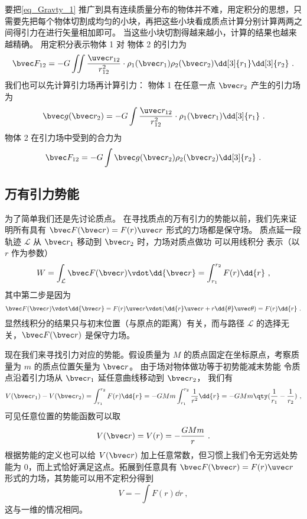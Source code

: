 要把\autoref{eq_Gravty_1} 推广到具有连续质量分布的物体并不难，用定积分的思想，只需要先把每个物体切割成均匀的小块，再把这些小块看成质点计算分别计算两两之间得引力在进行矢量相加即可。 当这些小块切割得越来越小，计算的结果也越来越精确。 用定积分表示物体 1 对 物体 2 的引力为
\begin{equation}
\bvec F_{12} = -G\iint \frac{\uvec r_{12}}{r_{12}^2}  \cdot \rho_1(\bvec r_1) \rho_2(\bvec r_2) \dd[3]{r_1} \dd[3]{r_2}~.
\end{equation}
我们也可以先计算引力场再计算引力： 物体 1 在任意一点 $\bvec r_2$ 产生的引力场为
\begin{equation}\label{eq_Gravty_4}
\bvec g(\bvec r_2) = -G\int \frac{\uvec r_{12}}{r_{12}^2}  \cdot \rho_1(\bvec r_1) \dd[3]{r_1}~.
\end{equation}
物体 2 在引力场中受到的合力为
\begin{equation}
\bvec F_{12} = -G\int \bvec g(\bvec r_2)\rho_2(\bvec r_2) \dd[3]{r_2}~.
\end{equation}

\subsection{万有引力势能}

为了简单我们还是先讨论质点。 在寻找质点的万有引力的势能以前，我们先来证明所有具有 $\bvec F(\bvec r) = F(r) \uvec r$ 形式的力场都是保守场。 质点延一段轨迹 $\mathcal{L}$ 从 $\bvec r_1$ 移动到 $\bvec r_2$ 时，力场对质点做功 可以用线积分 表示（以 $r$ 作为参数）
\begin{equation}\label{eq_Gravty_3}
W = \int_\mathcal{L} \bvec F(\bvec r) \vdot \dd{\bvec r} = \int_{r_1}^{r_2} F(r) \dd{r}~,
\end{equation}
其中第二步是因为
\begin{equation}
\bvec F(\bvec r) \vdot \dd{\bvec r} = F(r)\uvec  r \vdot (\dd{r} \uvec  r + r\dd{\theta} \uvec \theta ) = F(r) \dd{r}~.
\end{equation}
显然线积分的结果只与初末位置（与原点的距离）有关，而与路径 $\mathcal{L}$ 的选择无关，$\bvec F(\bvec r)$ 是保守力场。

现在我们来寻找引力对应的势能。假设质量为 $M$ 的质点固定在坐标原点，考察质量为 $m$ 的质点位置矢量为 $\bvec r$。 由于场对物体做功等于初势能减末势能
令质点沿着引力场从 ${\bvec r_1}$ 延任意曲线移动到 $\bvec r_2$， 我们有
\begin{equation}
V(\bvec r_1) - V(\bvec r_2) = \int_{r_1}^{r_2} F(r) \dd{r} =  - GMm\int_{r_1}^{r_2} \frac{1}{r^2} \dd{r}  =  - GMm \qty( \frac{1}{r_1} - \frac{1}{r_2} )~,
\end{equation}
可见任意位置的势能函数可以取
\begin{equation}
V(\bvec r) = V(r) = - \frac{GMm}{r}~.
\end{equation}
根据势能的定义也可以给 $V(\bvec r)$ 加上任意常数，但习惯上我们令无穷远处势能为 0，而上式恰好满足这点。拓展到任意具有 $\bvec F(\bvec r) = F(r)\uvec r$ 形式的力场，其势能可以用不定积分得到
\begin{equation}\label{eq_Gravty_7}
V = -\int F(r) \dd{r}~,
\end{equation}
这与一维的情况相同。%

